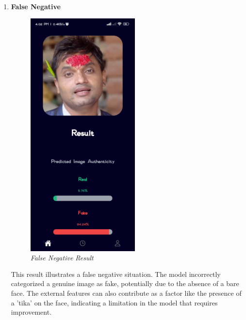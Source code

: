 \begin{enumerate}
    \item \textbf{False Negative}
       \\
          \begin{figure}[ht]
              \centering
              \includegraphics[height =5in ]{img/dashainResult.jpg}
              \caption{\textit{False Negative Result}}
          \end{figure}
          
          This result illustrates a false negative situation. The model incorrectly categorized a genuine image as fake, potentially due to the absence of a bare face. The external features can also contribute as a factor like the presence of a 'tika' on the face, indicating a limitation in the model that requires improvement.

          \newpage

\end{enumerate}

